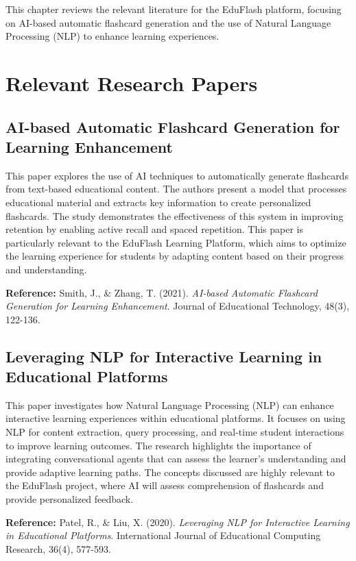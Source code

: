 \documentclass{report}
\begin{document}
\vspace{-\baselineskip} %

This chapter reviews the relevant literature for the EduFlash platform, focusing on AI-based automatic flashcard generation and the use of Natural Language Processing (NLP) to enhance learning experiences.

\section{Relevant Research Papers}

\subsection{AI-based Automatic Flashcard Generation for Learning Enhancement}
This paper explores the use of AI techniques to automatically generate flashcards from text-based educational content. The authors present a model that processes educational material and extracts key information to create personalized flashcards. The study demonstrates the effectiveness of this system in improving retention by enabling active recall and spaced repetition. This paper is particularly relevant to the EduFlash Learning Platform, which aims to optimize the learning experience for students by adapting content based on their progress and understanding.

\textbf{Reference:} Smith, J., \& Zhang, T. (2021). \textit{AI-based Automatic Flashcard Generation for Learning Enhancement}. Journal of Educational Technology, 48(3), 122-136. \\


\subsection{Leveraging NLP for Interactive Learning in Educational Platforms}
This paper investigates how Natural Language Processing (NLP) can enhance interactive learning experiences within educational platforms. It focuses on using NLP for content extraction, query processing, and real-time student interactions to improve learning outcomes. The research highlights the importance of integrating conversational agents that can assess the learner's understanding and provide adaptive learning paths. The concepts discussed are highly relevant to the EduFlash project, where AI will assess comprehension of flashcards and provide personalized feedback.

\textbf{Reference:} Patel, R., \& Liu, X. (2020). \textit{Leveraging NLP for Interactive Learning in Educational Platforms}. International Journal of Educational Computing Research, 36(4), 577-593. \\
\end{document}
